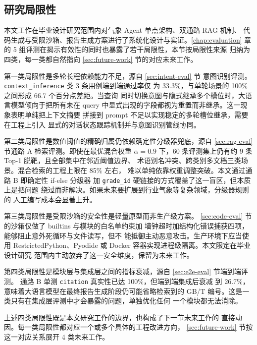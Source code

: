
\subsection{研究局限性}
\label{sec:limitations}

本文工作在毕业设计研究范围内对气象 Agent 单点架构、双通路 RAG 机制、
代码生成与受限沙箱、报告生成方案进行了系统化设计与实证。\ref{chap:evaluation}
章的 5 组评测在揭示有效性的同时也暴露了若干局限性，本节按局限性来源
归纳为四类，每一类都自然指向 \ref{sec:future-work} 节的对应未来工作。

第一类局限性是多轮长程依赖能力不足，源自 \ref{sec:intent-eval} 节
意图识别评测。\texttt{context\_\bk{}inference} 类 3 条用例端到端通过率仅
为 33.3\%，与单轮场景的 100\% 之间形成 66.7 个百分点差距。当查询
同时切换意图与隐式继承多个槽位时，大语言模型倾向于把所有未在 query
中显式出现的字段都视为重置而非继承。这一现象表明单纯把上下文摘要
拼接到 prompt 不足以实现稳定的多轮槽位继承，需要在工程上引入
显式的对话状态跟踪机制并与意图识别管线协同。

第二类局限性是数值阈值的精确归属仍依赖确定性分级器兜底，源自
\ref{sec:rag-eval} 节通路 A 检索评测。即使在最优混合权重 $\alpha=0.9$
下，60 条评测集上仍有约 9 条 Top-1 脱靶，且全部集中在邻近阈值边界、
术语别名冲突、跨类别多文档三类场景。混合检索的工程上限在 85\% 左右，
难以单纯依靠权重调整突破。本文通过通路 B 即确定性 if-else 分级器
加 \texttt{grade\_\bk{}id} 硬链接的方式覆盖了这一盲区，但本质上是把问题
绕过而非解决。如果未来要扩展到行业气象等复杂领域，分级器规则的
人工编写成本会显著上升。

第三类局限性是受限沙箱的安全性是轻量原型而非生产级方案。
\ref{sec:code-eval} 节的沙箱仅做了 builtins 与模块的白名单约束加
墙钟超时加结构化错误捕获四项，能够阻止意外死循环与文件读写，但不
能抵御主动恶意攻击。生产环境下应当使用 RestrictedPython、Pyodide
或 Docker 容器实现进程级隔离。本文限定在毕业设计研究
范围内主动放弃了这一安全维度，保留为未来工作。

第四类局限性是模块层与集成层之间的指标衰减，源自 \ref{sec:e2e-eval} 节端到端评测。
通路 B 单测 \texttt{citation} 真实性已达 100\%，但端到端集成后衰减
到 26.7\%，意味着大语言模型在最终报告生成阶段仍可能省略检索到的
GB/T 编号。这是一类只有在集成层评测中才会暴露的问题，单独优化任何
一个模块都无法消除。

上述四类局限性既是本文研究工作的边界，也构成了下一节未来工作的
直接动因。每一类局限性都对应一个或多个具体的工程改进方向，
\ref{sec:future-work} 节按这一对应关系展开 4 类未来工作。
